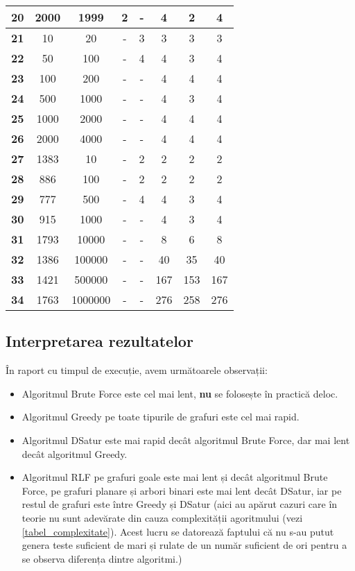 \documentclass[runningheads]{paper}
\begin{document}
\begin{table}[!]
\begin{tabular}{|c|c|c|c|c|c|c|c|}
\textbf{20} & 2000 & 1999 & 2 & - & 4 & 2 & 4 \\ \hline 
\textbf{21} & 10 & 20 & - & 3 & 3 & 3 & 3 \\ \hline 
\textbf{22} & 50 & 100 & - & 4 & 4 & 3 & 4 \\ \hline 
\textbf{23} & 100 & 200 & - & - & 4 & 4 & 4 \\ \hline 
\textbf{24} & 500 & 1000 & - & - & 4 & 3 & 4 \\ \hline 
\textbf{25} & 1000 & 2000 & - & - & 4 & 4 & 4 \\ \hline 
\textbf{26} & 2000 & 4000 & - & - & 4 & 4 & 4 \\ \hline 
\textbf{27} & 1383 & 10 & - & 2 & 2 & 2 & 2 \\ \hline 
\textbf{28} & 886 & 100 & - & 2 & 2 & 2 & 2 \\ \hline 
\textbf{29} & 777 & 500 & - & 4 & 4 & 3 & 4 \\ \hline 
\textbf{30} & 915 & 1000 & - & - & 4 & 3 & 4 \\ \hline 
\textbf{31} & 1793 & 10000 & - & - & 8 & 6 & 8 \\ \hline 
\textbf{32} & 1386 & 100000 & - & - & 40 & 35 & 40 \\ \hline 
\textbf{33} & 1421 & 500000 & - & - & 167 & 153 & 167 \\ \hline 
\textbf{34} & 1763 & 1000000 & - & - & 276 & 258 & 276 \\ \hline 
\end{tabular}
\end{table}

\subsection{Interpretarea rezultatelor}
În raport cu timpul de execuție, avem următoarele observații:
\begin{itemize}
    \item Algoritmul Brute Force este cel mai lent, \textbf{nu} se folosește
    în practică deloc.
    \item Algoritmul Greedy pe toate tipurile de grafuri este cel mai rapid.
    \item Algoritmul DSatur este mai rapid decât algoritmul Brute Force, dar
    mai lent decât algoritmul Greedy.
    \item Algoritmul RLF pe grafuri goale este mai lent și decât algoritmul
    Brute Force, pe grafuri planare și arbori binari este mai lent decât DSatur, 
    iar pe restul de grafuri este între Greedy și DSatur (aici au apărut cazuri
    care în teorie nu sunt adevărate din cauza complexității agoritmului (vezi \ref{tabel_complexitate}).
    Acest lucru se datorează faptului că nu s-au putut genera teste suficient de
    mari și rulate de un număr suficient de ori pentru a se observa diferența dintre algoritmi.)

\end{itemize}
\end{document}
